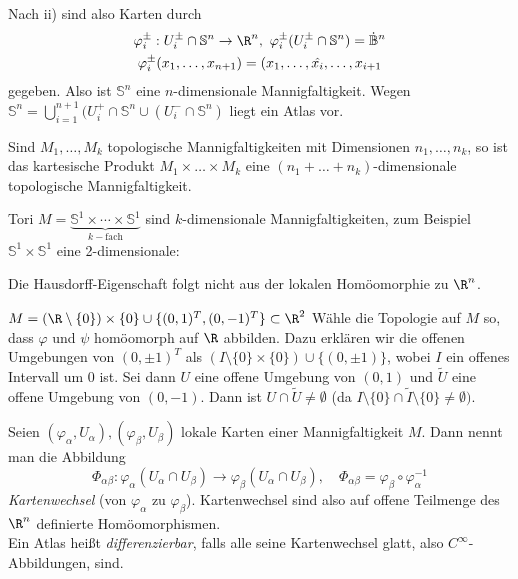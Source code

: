\begin{exmp}
\begin{enumerate}[label= {\roman*})]
			Nach ii) sind also Karten durch
			\begin{gather*}
				\varphi_i^\pm : U_i^\pm \cap \mathbb{S}^n \to \R^n,\ \varphi_i^\pm(U_i^\pm \cap \mathbb{S}^n) = \dot{\mathbb{B}}^n \\
				\varphi_i^\pm(x_1,\dotsc,x_{n+1}) = (x_1,\dotsc,\hat{x_i},\dotsc,x_{i+1} 
			\end{gather*} gegeben. Also ist $\mathbb{S}^n$  eine $n$-dimensionale Mannigfaltigkeit. Wegen $\mathbb{S}^n = \bigcup_{i=1}^{n+1} (U_i^+ \cap \mathbb{S}^n \cup (U_i^- \cap \mathbb{S}^n)$ liegt ein Atlas vor.
	\end{enumerate}
\end{exmp}



\begin{lem}\label{lem1_3}
	Sind $ M_1, \dotsc, M_k $ topologische Mannigfaltigkeiten mit Dimensionen $ n_1,\dotsc,n_k $, so ist das kartesische Produkt $ M_1 \times \dots \times M_k $ eine $ (n_1 + \dots + n_k) $-dimensionale topologische Mannigfaltigkeit.
\end{lem}

\begin{exmp*}
	Tori $ M = \underbrace{\mathbb{S}^1 \times \dotsm \times \mathbb{S}^1}_{k-\text{fach}} $ sind $k$-dimensionale Mannigfaltigkeiten, zum Beispiel $\mathbb{S}^1 \times \mathbb{S}^1$ eine 2-dimensionale:
\end{exmp*}

\begin{rem*}
	Die Hausdorff-Eigenschaft folgt nicht aus der lokalen Homöomorphie zu $\R^n$.
\end{rem*}
	
\begin{exmp*}
	$ M = (\R \setminus \{0\}) \times \{0\} \cup \{ (0,1)^T, (0,-1)^T \} \subset \R^2 $
	Wähle die Topologie auf $M$ so, dass $\varphi$ und $\psi$ homöomorph auf $\R$ abbilden. Dazu erklären wir die offenen Umgebungen von $ (0,\pm 1)^T $ als $ (I \setminus \{0\} \times \{0\}) \cup \{(0,\pm 1)\}$, wobei $I$ ein offenes Intervall um 0 ist. Sei dann $U$ eine offene Umgebung von $(0,1) $ und $\tilde{U}$ eine offene Umgebung von $(0,-1)$. Dann ist $U \cap \tilde{U} \neq \emptyset$ (da $I \setminus \{0\} \cap \tilde{I}\setminus\{0\} \neq \emptyset).$
\end{exmp*}

\begin{defn}[Kartenwechsel]
	Seien $ (\varphi_\alpha,U_\alpha), (\varphi_\beta,U_\beta) $ lokale Karten einer Mannigfaltigkeit $M$. Dann nennt man die Abbildung
	\[ \Phi_{\alpha\beta}: \varphi_\alpha(U_\alpha \cap U_\beta) \to \varphi_\beta(U_\alpha \cap U_\beta),\quad \Phi_{\alpha\beta} = \varphi_\beta \circ \varphi_\alpha^{-1} \]
	\emph{Kartenwechsel} (von $ \varphi_\alpha $ zu $\varphi_\beta$). Kartenwechsel sind also auf offene Teilmenge des $\R^n$ definierte Homöomorphismen.\\
	Ein Atlas heißt \emph{differenzierbar}, falls alle seine Kartenwechsel glatt, also $C^\infty$-Abbildungen, sind.
\end{defn}

